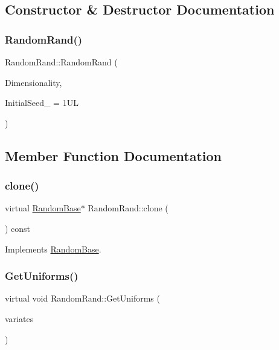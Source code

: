 \subsection{Constructor \& Destructor Documentation}
\hypertarget{classRandomRand_a49f39d6181f10816e1a71fccfb706d77}{}\label{classRandomRand_a49f39d6181f10816e1a71fccfb706d77} 
\subsubsection{\texorpdfstring{Random\+Rand()}{RandomRand()}}
{\footnotesize\ttfamily Random\+Rand\+::\+Random\+Rand (\begin{DoxyParamCaption}\item[{unsigned long}]{Dimensionality,  }\item[{unsigned long}]{Initial\+Seed\+\_\+ = {\ttfamily 1UL} }\end{DoxyParamCaption})}



\subsection{Member Function Documentation}
\hypertarget{classRandomRand_a7499fbf182a11829cac3068bc66ffe22}{}\label{classRandomRand_a7499fbf182a11829cac3068bc66ffe22} 
\subsubsection{\texorpdfstring{clone()}{clone()}}
{\footnotesize\ttfamily virtual \hyperlink{classRandomBase}{Random\+Base}$\ast$ Random\+Rand\+::clone (\begin{DoxyParamCaption}{ }\end{DoxyParamCaption}) const\hspace{0.3cm}{\ttfamily [virtual]}}



Implements \hyperlink{classRandomBase_a0906f4590283535ec40427ad31ba7850}{Random\+Base}.

\hypertarget{classRandomRand_acd17f14742903f5b88f9b1175f16098c}{}\label{classRandomRand_acd17f14742903f5b88f9b1175f16098c} 
\subsubsection{\texorpdfstring{Get\+Uniforms()}{GetUniforms()}}
{\footnotesize\ttfamily virtual void Random\+Rand\+::\+Get\+Uniforms (\begin{DoxyParamCaption}\item[{\hyperlink{classMJArray}{M\+J\+Array} \&}]{variates }\end{DoxyParamCaption})\hspace{0.3cm}{\ttfamily [virtual]}}



